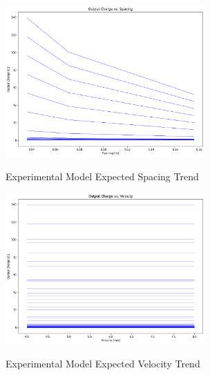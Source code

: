 \begin{figure}
    \begin{center}
    \includegraphics[width=3in]{fig35.png}
    \end{center}
    \renewcommand{\baselinestretch}{1}
    \small\normalsize
    \begin{quote}
    \caption[Experimental Model Expected Spacing Trend]{Experimental Model Expected Spacing Trend} \label{fig: f35}
    \end{quote}
\end{figure}

\begin{figure}
    \begin{center}
    \includegraphics[width=3in]{fig36.png}
    \end{center}
    \renewcommand{\baselinestretch}{1}
    \small\normalsize
    \begin{quote}
    \caption[Experimental Model Expected Velocity Trend]{Experimental Model Expected Velocity Trend} \label{fig: f36}
    \end{quote}
\end{figure}

